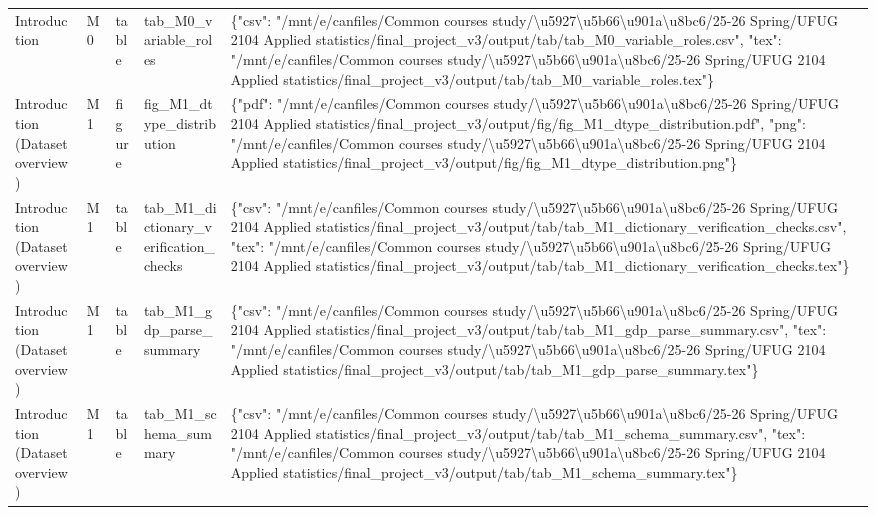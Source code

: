 \begin{tabular}{lllll}
Introduction & M0 & table & tab\_M0\_variable\_roles & \{"csv": "/mnt/e/canfiles/Common courses study/\textbackslash u5927\textbackslash u5b66\textbackslash u901a\textbackslash u8bc6/25-26 Spring/UFUG 2104 Applied statistics/final\_project\_v3/output/tab/tab\_M0\_variable\_roles.csv", "tex": "/mnt/e/canfiles/Common courses study/\textbackslash u5927\textbackslash u5b66\textbackslash u901a\textbackslash u8bc6/25-26 Spring/UFUG 2104 Applied statistics/final\_project\_v3/output/tab/tab\_M0\_variable\_roles.tex"\} \\
Introduction (Dataset overview) & M1 & figure & fig\_M1\_dtype\_distribution & \{"pdf": "/mnt/e/canfiles/Common courses study/\textbackslash u5927\textbackslash u5b66\textbackslash u901a\textbackslash u8bc6/25-26 Spring/UFUG 2104 Applied statistics/final\_project\_v3/output/fig/fig\_M1\_dtype\_distribution.pdf", "png": "/mnt/e/canfiles/Common courses study/\textbackslash u5927\textbackslash u5b66\textbackslash u901a\textbackslash u8bc6/25-26 Spring/UFUG 2104 Applied statistics/final\_project\_v3/output/fig/fig\_M1\_dtype\_distribution.png"\} \\
Introduction (Dataset overview) & M1 & table & tab\_M1\_dictionary\_verification\_checks & \{"csv": "/mnt/e/canfiles/Common courses study/\textbackslash u5927\textbackslash u5b66\textbackslash u901a\textbackslash u8bc6/25-26 Spring/UFUG 2104 Applied statistics/final\_project\_v3/output/tab/tab\_M1\_dictionary\_verification\_checks.csv", "tex": "/mnt/e/canfiles/Common courses study/\textbackslash u5927\textbackslash u5b66\textbackslash u901a\textbackslash u8bc6/25-26 Spring/UFUG 2104 Applied statistics/final\_project\_v3/output/tab/tab\_M1\_dictionary\_verification\_checks.tex"\} \\
Introduction (Dataset overview) & M1 & table & tab\_M1\_gdp\_parse\_summary & \{"csv": "/mnt/e/canfiles/Common courses study/\textbackslash u5927\textbackslash u5b66\textbackslash u901a\textbackslash u8bc6/25-26 Spring/UFUG 2104 Applied statistics/final\_project\_v3/output/tab/tab\_M1\_gdp\_parse\_summary.csv", "tex": "/mnt/e/canfiles/Common courses study/\textbackslash u5927\textbackslash u5b66\textbackslash u901a\textbackslash u8bc6/25-26 Spring/UFUG 2104 Applied statistics/final\_project\_v3/output/tab/tab\_M1\_gdp\_parse\_summary.tex"\} \\
Introduction (Dataset overview) & M1 & table & tab\_M1\_schema\_summary & \{"csv": "/mnt/e/canfiles/Common courses study/\textbackslash u5927\textbackslash u5b66\textbackslash u901a\textbackslash u8bc6/25-26 Spring/UFUG 2104 Applied statistics/final\_project\_v3/output/tab/tab\_M1\_schema\_summary.csv", "tex": "/mnt/e/canfiles/Common courses study/\textbackslash u5927\textbackslash u5b66\textbackslash u901a\textbackslash u8bc6/25-26 Spring/UFUG 2104 Applied statistics/final\_project\_v3/output/tab/tab\_M1\_schema\_summary.tex"\} \\

\end{tabular}
